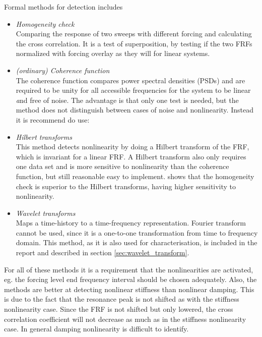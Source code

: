 Formal methods for detection includes
\begin{itemize}
\item \textit{Homogeneity check} \\
  Comparing the response of two sweeps with different forcing and calculating
  the cross correlation. It is a test of superposition, by testing if the two FRFs
  normalized with forcing overlay as they will for linear systems.
\item \textit{(ordinary) Coherence function} \\
  The coherence function compares power spectral densities (PSDs) and are
  required to be unity for all accessible frequencies for the system to be
  linear {\textit and} free of noise. The advantage is that only one test is needed,
  but the method does not distinguish between cases of noise and
  nonlinearity. Instead it is recommend do use:
\item \textit{Hilbert transforms} \\
  This method detects nonlinearity by doing a Hilbert transform of the FRF,
  which is invariant for a linear FRF.
  A Hilbert transform also only requires one data set and is more sensitive to
  nonlinearity than the coherence function, but still reasonable easy to
  implement. \textcite{kragh2010a} shows that the homogeneity check is superior to
  the Hilbert transforms, having higher sensitivity to nonlinearity.
\item \textit{Wavelet transforms} \\
  Maps a time-history to a time-frequency representation. Fourier transform
  cannot be used, since it is a one-to-one transformation from time to frequency
  domain. This method, as it is also used for characterisation, is included in
  the report and described in section \ref{sec:wavelet_transform}.
\end{itemize}

For all of these methods it is a requirement that the nonlinearities are
activated, eg. the forcing level end frequency interval should be chosen
adequately. Also, the methods are better at detecting nonlinear stiffness than
nonlinear damping. This is due to the fact that the resonance peak is not
shifted as with the stiffness nonlinearity case. Since the FRF is not shifted
but only lowered, the cross correlation coefficient will not decrease as much as
in the stiffness nonlinearity case. In general damping nonlinearity is difficult
to identify.

